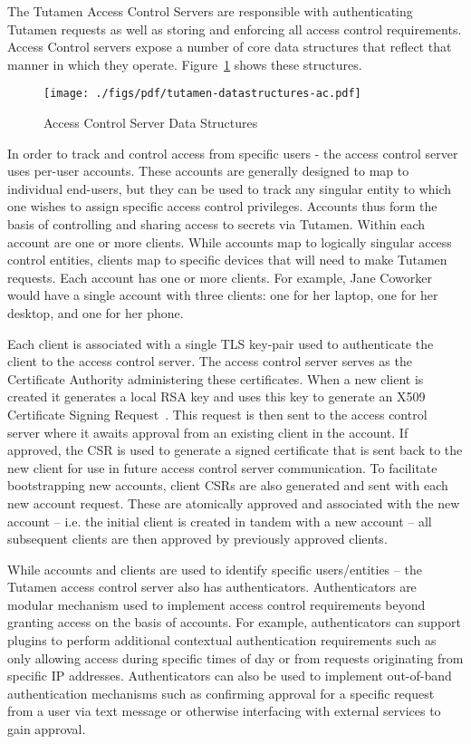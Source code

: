 The Tutamen Access Control Servers are responsible with authenticating
Tutamen requests as well as storing and enforcing all access control
requirements. Access Control servers expose a number of core data
structures that reflect that manner in which they
operate. Figure~\ref{fig:tutamen:acstructs} shows these structures.

\begin{figure}[th]
  \centering
  \texttt{[image: ./figs/pdf/tutamen-datastructures-ac.pdf]}
  \caption{Access Control Server Data Structures}
  \label{fig:tutamen:acstructs}
\end{figure}

In order to track and control access from specific users - the access
control server uses per-user accounts. These accounts are generally
designed to map to individual end-users, but they can be used to track
any singular entity to which one wishes to assign specific access
control privileges. Accounts thus form the basis of controlling and
sharing access to secrets via Tutamen. Within each account are one or
more clients. While accounts map to logically singular access control
entities, clients map to specific devices that will need to make
Tutamen requests. Each account has one or more clients. For example,
Jane Coworker would have a single account with three clients: one for
her laptop, one for her desktop, and one for her phone.

Each client is associated with a single TLS key-pair used to
authenticate the client to the access control server. The access
control server serves as the Certificate Authority administering these
certificates. When a new client is created it generates a local RSA
key and uses this key to generate an X509 Certificate Signing
Request~\cite{rfc5280}. This request is then sent to the access
control server where it awaits approval from an existing client in the
account. If approved, the CSR is used to generate a signed certificate
that is sent back to the new client for use in future access control
server communication. To facilitate bootstrapping new accounts, client
CSRs are also generated and sent with each new account request. These
are atomically approved and associated with the new account --
i.e. the initial client is created in tandem with a new account -- all
subsequent clients are then approved by previously approved clients.

While accounts and clients are used to identify specific
users/entities -- the Tutamen access control server also has
authenticators. Authenticators are modular mechanism used to implement
access control requirements beyond granting access on the basis of
accounts. For example, authenticators can support plugins to perform
additional contextual authentication requirements such as only
allowing access during specific times of day or from requests
originating from specific IP addresses. Authenticators can also be
used to implement out-of-band authentication mechanisms such as
confirming approval for a specific request from a user via text
message or otherwise interfacing with external services to gain
approval.

